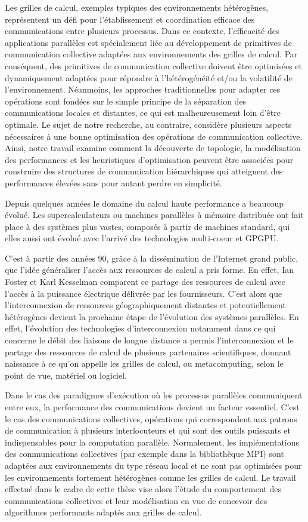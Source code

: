 \documentclass[a4paper]{book}
\begin{document}
Les grilles de calcul, exemples typiques des environnements hétérogènes, représentent un défi pour l'établissement et coordination efficace des communications entre plusieurs processus. Dans ce contexte, l'efficacité des applications parallèles est spécialement liée au développement de primitives de communication collective adaptées aux environnements des grilles de calcul. Par conséquent, des primitives de communication collective doivent être optimisées et dynamiquement adaptées pour répondre à l'hétérogénéité et/ou la volatilité de l'environnement. Néanmoins, les approches traditionnelles pour adapter ces opérations sont fondées sur le simple principe de la séparation des communications locales et distantes, ce qui est malheureusement loin d'être optimale. Le sujet de notre recherche, au contraire, considère plusieurs aspects nécessaires à une bonne optimisation des opérations de communication collective. Ainsi, notre travail examine comment la découverte de topologie, la modélisation des performances et les heuristiques d'optimisation peuvent être associées pour construire des structures de communication hiérarchiques qui atteignent des performances élevées sans pour autant perdre en simplicité.

Depuis quelques années le domaine du calcul haute performance a beaucoup évolué. Les supercalculateurs ou machines parallèles à mémoire distribuée ont fait place à des systèmes plus vastes, composés à partir de machines standard, qui elles aussi ont évolué avec l'arrivé des technologies multi-coeur et GPGPU.

C'est à partir des années 90, grâce à la dissémination de l'Internet grand public, que l'idée généraliser l'accès aux ressources de calcul a pris forme. En effet, Ian Foster et Karl Kesselman comparent ce partage des ressources de calcul avec l'accès à la puissance électrique délivrée par les fournisseurs. C'est alors que l'interconnexion de ressources géographiquement distantes et potentiellement hétérogènes devient la prochaine étape de l'évolution des systèmes parallèles. En effet, l'évolution des technologies d'interconnexion notamment dans ce qui concerne le débit des liaisons de longue distance a permis l'interconnexion et le partage des ressources de calcul de plusieurs partenaires scientifiques, donnant naissance à ce qu'on appelle les grilles de calcul, ou metacomputing, selon le point de vue, matériel ou logiciel.

Dans le cas des paradigmes d'exécution où les processus parallèles communiquent entre eux, la performance des communications devient un facteur essentiel. C'est le cas des communications collectives, opérations qui correspondent aux patrons de communication à plusieurs interlocuteurs et qui sont des outils puissants et indispensables pour la computation parallèle. Normalement, les implémentations des communications collectives (par exemple dans la bibliothèque MPI) sont adaptées aux environnements du type réseau local et ne sont pas optimisées pour les environnements fortement hétérogènes comme les grilles de calcul. Le travail effectué dans le cadre de cette thèse vise alors l'étude du comportement des communications collectives et leur modélisation en vue de concevoir des algorithmes performants adaptés aux grilles de calcul.
\end{document}
